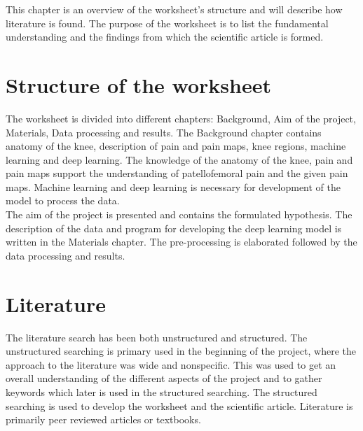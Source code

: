 This chapter is an overview of the worksheet’s structure and will describe how literature is found. 
The purpose of the worksheet is to list the fundamental understanding and the findings from which the scientific article is formed. 

\section{Structure of the worksheet}
The worksheet is divided into different chapters: Background, Aim of the project, Materials, Data processing and results. The Background chapter contains anatomy of the knee, description of pain and pain maps, knee regions, machine learning and deep learning. The knowledge of the anatomy of the knee, pain and pain maps support the understanding of patellofemoral pain and the given pain maps. Machine learning and deep learning is necessary for development of the model to process the data. \\
\noindent
The aim of the project is presented and contains the formulated hypothesis. The description of the data and program for developing the deep learning model is written in the Materials chapter. The pre-processing is elaborated followed by the data processing and results. 

\section{Literature}

The literature search has been both unstructured and structured. The unstructured searching is primary used in the beginning of the project, where the approach to the literature was wide and nonspecific. This was used to get an overall understanding of the different aspects of the project and to gather keywords which later is used in the structured searching. The structured searching is used to develop the worksheet and the scientific article. Literature is primarily peer reviewed articles or textbooks.

